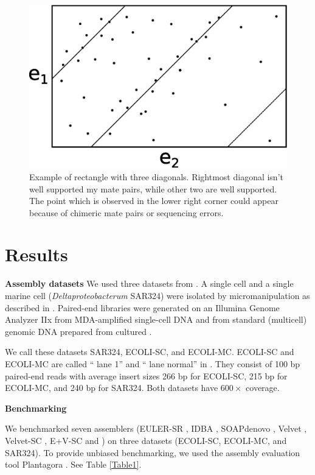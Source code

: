 \begin{figure}
\begin{center}
\includegraphics[scale=0.5]{fig/rectangle.eps}
\caption{Example of rectangle with three diagonals. Rightmost diagonal isn't well supported my mate pairs, while other two are well supported. The point which is observed in the lower right corner could appear because of chimeric mate pairs or sequencing errors.}
\end{center}
\end{figure}


\section{Results}

\textbf{Assembly datasets}
%
We used three datasets from \cite{Chitsaz2011}.
A single {\ecoli} cell
and a single marine cell ({\em Deltaproteobacterum} SAR324)
were isolated by micromanipulation as described in \cite{Ishoey2008}.
Paired-end libraries were generated on an Illumina Genome Analyzer IIx from MDA-amplified single-cell DNA
and
from standard (multicell) genomic DNA prepared from cultured {\ecoli}.

We call these datasets SAR324, ECOLI-SC, and ECOLI-MC.
ECOLI-SC and ECOLI-MC are called ``{\ecoli} lane 1'' and ``{\ecoli} lane normal'' in \cite{Chitsaz2011}.
They consist of 100 bp paired-end reads
with average insert sizes 266 bp for ECOLI-SC, 215 bp for ECOLI-MC,
and 240 bp for SAR324.
Both datasets have $600\times$ coverage.

\textbf{Benchmarking}

We benchmarked seven assemblers
(EULER-SR \cite{Chaisson08}, IDBA \cite{Peng10}, SOAPdenovo \cite{Li10}, Velvet \cite{Zerbino08}, Velvet-SC \cite{Chitsaz2011}, E+V-SC \cite{Chitsaz2011} and {\spades}) on three datasets
(ECOLI-SC, ECOLI-MC, and SAR324). To provide unbiased
benchmarking, we used the assembly evaluation tool Plantagora \cite{Barthelson2011}. See Table \ref{Table1}.

